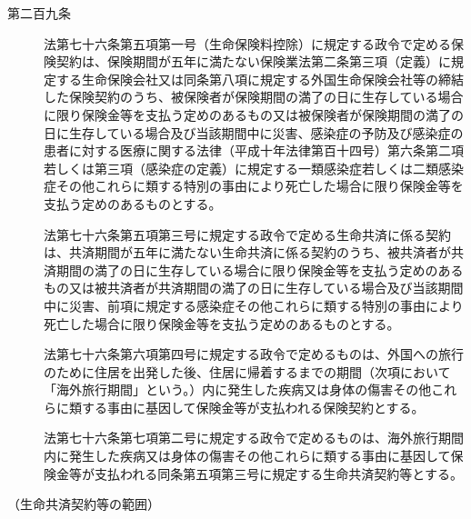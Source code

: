 \documentclass[twocolumn,a4j,10pt]{ltjtarticle}
\begin{document}
\begin{description}
\item[第二百九条]法第七十六条第五項第一号（生命保険料控除）に規定する政令で定める保険契約は、保険期間が五年に満たない保険業法第二条第三項（定義）に規定する生命保険会社又は同条第八項に規定する外国生命保険会社等の締結した保険契約のうち、被保険者が保険期間の満了の日に生存している場合に限り保険金等を支払う定めのあるもの又は被保険者が保険期間の満了の日に生存している場合及び当該期間中に災害、感染症の予防及び感染症の患者に対する医療に関する法律（平成十年法律第百十四号）第六条第二項若しくは第三項（感染症の定義）に規定する一類感染症若しくは二類感染症その他これらに類する特別の事由により死亡した場合に限り保険金等を支払う定めのあるものとする。
\item[]法第七十六条第五項第三号に規定する政令で定める生命共済に係る契約は、共済期間が五年に満たない生命共済に係る契約のうち、被共済者が共済期間の満了の日に生存している場合に限り保険金等を支払う定めのあるもの又は被共済者が共済期間の満了の日に生存している場合及び当該期間中に災害、前項に規定する感染症その他これらに類する特別の事由により死亡した場合に限り保険金等を支払う定めのあるものとする。
\item[]法第七十六条第六項第四号に規定する政令で定めるものは、外国への旅行のために住居を出発した後、住居に帰着するまでの期間（次項において「海外旅行期間」という。）内に発生した疾病又は身体の傷害その他これらに類する事由に基因して保険金等が支払われる保険契約とする。
\item[]法第七十六条第七項第二号に規定する政令で定めるものは、海外旅行期間内に発生した疾病又は身体の傷害その他これらに類する事由に基因して保険金等が支払われる同条第五項第三号に規定する生命共済契約等とする。
\end{description}
\noindent\hspace{10pt}（生命共済契約等の範囲）
\end{document}
